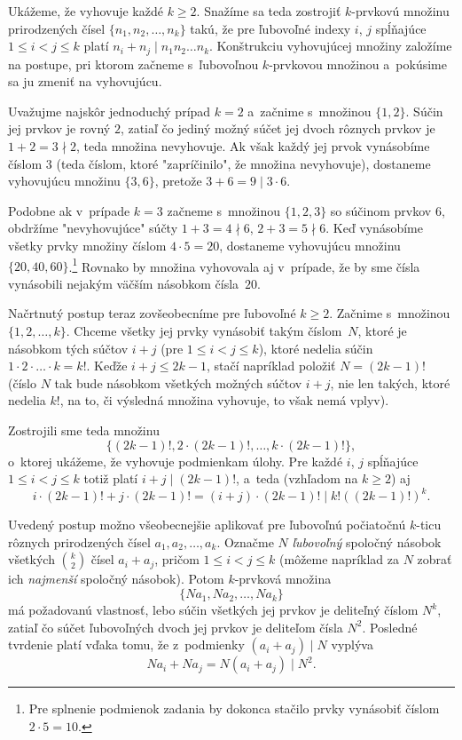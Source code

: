 {%
Ukážeme, že vyhovuje každé $k\ge2$. Snažíme sa teda zostrojiť $k$-prvkovú množinu prirodzených čísel $\{n_1,n_2,\dots,n_k\}$ takú, že pre ľubovoľné indexy $i$, $j$ spĺňajúce $1\le i<j\le k$ platí $n_i+n_j\mid n_1n_2\dots n_k$. Konštrukciu vyhovujúcej množiny založíme na postupe, pri ktorom začneme s~ľubovoľnou $k$-prvkovou množinou a~pokúsime sa ju zmeniť na vyhovujúcu.

Uvažujme najskôr jednoduchý prípad $k=2$ a~začnime s~množinou $\{1,2\}$. Súčin jej prvkov je rovný $2$, zatiaľ čo jediný možný súčet jej dvoch rôznych prvkov je $1+2=3\nmid 2$, teda množina nevyhovuje. Ak však každý jej prvok vynásobíme číslom $3$ (teda číslom, ktoré "zapríčinilo", že množina nevyhovuje), dostaneme vyhovujúcu množinu $\{3,6\}$, pretože $3+6=9\mid 3\cdot6$.

Podobne ak v~prípade $k=3$ začneme s~množinou $\{1,2,3\}$ so súčinom prvkov $6$, obdržíme "nevyhovujúce" súčty $1+3=4\nmid6$, $2+3=5\nmid6$. Keď vynásobíme všetky prvky množiny číslom $4\cdot5=20$, dostaneme vyhovujúcu množinu $\{20,40,60\}$.\footnote{Pre splnenie podmienok zadania by dokonca stačilo prvky vynásobiť číslom $2\cdot5=10$.} Rovnako by množina vyhovovala aj v~prípade, že by sme čísla vynásobili nejakým väčším násobkom čísla~$20$.

Načrtnutý postup teraz zovšeobecníme pre ľubovoľné $k\ge2$. Začnime s~množinou $\{1,2,\dots,k\}$. Chceme všetky jej prvky vynásobiť takým číslom~$N$, ktoré je násobkom tých súčtov $i+j$ (pre $1\le i<j\le k$), ktoré nedelia súčin $1\cdot2\cdot\dots\cdot k=k!$. Keďže $i+j\le 2k-1$, stačí napríklad položiť $N=(2k-1)!$ (číslo $N$ tak bude násobkom všetkých možných súčtov $i+j$, nie len takých, ktoré nedelia $k!$, na to, či výsledná množina vyhovuje, to však nemá vplyv).

Zostrojili sme teda množinu
$$
\bigl\{(2k-1)!,2\cdot(2k-1)!,\dots,k\cdot(2k-1)!\bigr\},
$$
o~ktorej ukážeme, že vyhovuje podmienkam úlohy. Pre každé $i$, $j$ spĺňajúce $1\le i<j\le k$ totiž platí $i+j\mid(2k-1)!$, a~teda (vzhľadom na $k\ge2$) aj
$$
i\cdot(2k-1)!+j\cdot(2k-1)! = (i+j)\cdot(2k-1)! \mid k!((2k-1)!)^k.
$$


\poznamka
Uvedený postup možno všeobecnejšie aplikovať pre ľubovoľnú počiatočnú $k$-ticu
rôznych prirodzených čísel $a_1,a_2,\dots,a_k$. Označme $N$
{\it ľubovoľný\/} spoločný násobok všetkých $\binom{k}{2}$ čísel
$a_i+a_j$, pričom $1\le i<j\le k$ (môžeme napríklad za $N$ zobrať ich {\it najmenší\/} spoločný násobok). Potom $k$-prvková množina
$$
\bigl\{Na_1,Na_2,\dots,Na_k\bigr\}
$$
má požadovanú vlastnosť, lebo súčin všetkých jej prvkov je
deliteľný číslom $N^k$, zatiaľ čo súčet ľubovoľných dvoch jej
prvkov je deliteľom čísla $N^2$. Posledné tvrdenie platí vďaka tomu,
že z~podmienky $(a_i+a_j)\mid N$ vyplýva
$$
Na_i+Na_j=N(a_i+a_j)\mid N^2.
$$

}
